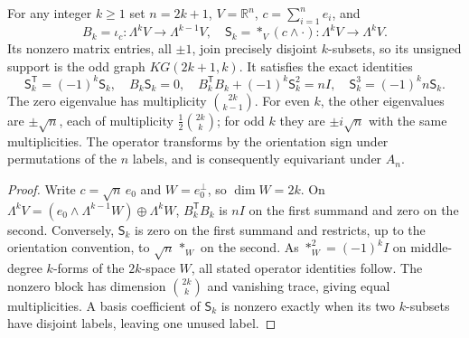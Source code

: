 \documentclass[11pt]{article}
\begin{document}
\begin{theorem}
\label{p1:thm:kneser-universal-odd-hodge}
For any integer $k\ge1$ set $n=2k+1$, $V=\mathbb R^n$,
$c=\sum_{i=1}^ne_i$, and
\[
 B_k=\iota_c:\Lambda^k V\to\Lambda^{k-1}V,
 \quad \mathsf S_k=*_V(c\wedge\cdot):\Lambda^kV\to\Lambda^kV.
\]
Its nonzero matrix entries, all $\pm1$, join precisely disjoint
$k$-subsets, so its unsigned support is the odd graph $KG(2k+1,k)$.
It satisfies the exact identities
\[
 \mathsf S_k^{\mathsf T}=(-1)^k\mathsf S_k,\quad
 B_k\mathsf S_k=0,\quad
 \boxed{B_k^{\mathsf T}B_k+(-1)^k\mathsf S_k^2=nI},
 \quad \mathsf S_k^3=(-1)^k n\mathsf S_k.
\]
The zero eigenvalue has multiplicity
$\binom{2k}{k-1}$. For even $k$, the other eigenvalues are
$\pm\sqrt n$, each of multiplicity $\tfrac12\binom{2k}{k}$;
for odd $k$ they are $\pm i\sqrt n$ with the same multiplicities.
The operator transforms by the orientation sign under permutations
of the $n$ labels, and is consequently equivariant under $A_n$.
\end{theorem}
\begin{proof}
Write $c=\sqrt n\,e_0$ and $W=e_0^\perp$, so $\dim W=2k$.
On $\Lambda^kV=(e_0\wedge\Lambda^{k-1}W)\oplus\Lambda^kW$,
$B_k^{\mathsf T}B_k$ is $nI$ on the first summand and zero on
the second. Conversely, $\mathsf S_k$ is zero on the first summand
and restricts, up to the orientation convention, to
$\sqrt n\,*_W$ on the second. As $*_W^2=(-1)^kI$ on
middle-degree $k$-forms of the $2k$-space $W$, all stated operator
identities follow. The nonzero block has dimension
$\binom{2k}{k}$ and vanishing trace, giving equal multiplicities.
A basis coefficient of $\mathsf S_k$ is nonzero exactly when its two
$k$-subsets have disjoint labels, leaving one unused label.
\end{proof}
\end{document}
